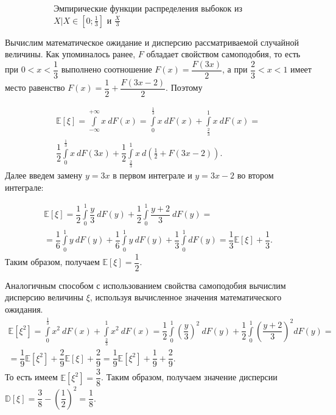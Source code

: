 \begin{figure}
\begin{subfigure}[b]{0.45\textwidth}
         \caption{Эмпирические функции распределения выбокок из
           $ X | X \in [0;\frac{1}{3}] $ и $ \frac{X}{3} $}
         \label{subfig:self-similarity}
     \end{subfigure}
     \caption{}
     \label{fig:cantor_properties}
\end{figure}

Вычислим математическое ожидание и дисперсию рассматриваемой случайной величины. 
Как упоминалось ранее, $ F $ обладает свойством самоподобия, то есть при
 $  0 < x < \dfrac{1}{3} $ выполнено соотношение $ F(x) = \dfrac{F(3x)}{2} $,
 а при $ \dfrac{2}{3} < x < 1 $ имеет место равенство $ F(x) = \dfrac{1}{2} +
 \dfrac{F(3x - 2)}{2} $. Поэтому

\begin{multline*}
\mathbb{E}[\xi] = \int\limits_{-\infty}^{+\infty} x \ dF(x) =
 \int\limits_{0}^{\frac{1}{3}} x \ dF(x) + \int\limits_{\frac{2}{3}}^{1} x \ dF(x) = \\
 \dfrac{1}{2} \int\limits_{0}^{\frac{1}{3}} x \ dF(3 x) + \dfrac{1}{2}
 \int\limits_{\frac{2}{3}}^{1} x \ d(\frac{1}{2} + F(3x - 2)).
\end{multline*}
Далее введем замену $y=3x$ в первом интеграле и $y=3x-2$ во втором интеграле:

\begin{multline*}
     \mathbb{E}[\xi] = \dfrac{1}{2} \int\limits_{0}^{1} \dfrac{y}{3} \ dF(y)
     + \dfrac{1}{2} \int\limits_{0}^{1} \dfrac{y+2}{3} \ dF(y) = \\
     = \dfrac{1}{6} \int\limits_{0}^{1} y \ dF(y) + \dfrac{1}{6}
     \int\limits_{0}^{1} y \ dF(y) + \dfrac{1}{3} \int\limits_{0}^{1} dF(y) =
     \dfrac{1}{3} \mathbb{E}[\xi] + \dfrac{1}{3}.
\end{multline*}
Таким образом, получаем $ \mathbb{E}[\xi] = \dfrac{1}{2} $.

Аналогичным способом с использованием свойства самоподобия вычислим дисперсию
 величины $ \xi $, используя вычисленное значения математического ожидания.
\begin{multline*}
     \mathbb{E}[\xi^2] = \int\limits_{0}^{\frac{1}{3}} x^2 \ dF(x) +
      \int\limits_{\frac{2}{3}}^{1} x^2 \ dF(x) = \dfrac{1}{2}\int\limits_{0}^{1}
      \left( \dfrac{y}{3} \right)^2 \ dF(y) + \dfrac{1}{2} \int\limits_{0}^{1}
      \left(\dfrac{y+2}{3}\right)^2dF(y) =\\
      = \dfrac{1}{9} \mathbb{E}[\xi^2] + \dfrac{2}{9} \mathbb{E}[\xi] + \dfrac{2}{9} =
      \dfrac{1}{9} \mathbb{E}[\xi^2] + \dfrac{1}{9} + \dfrac{2}{9}.
\end{multline*}
То есть имеем $ \mathbb{E}[\xi^2] = \dfrac{3}{8} $. Таким образом, получаем значение
 дисперсии $ \mathbb{D}[\xi] = \dfrac{3}{8} - \left( \dfrac{1}{2} \right)^2 =
  \dfrac{1}{8} $.

